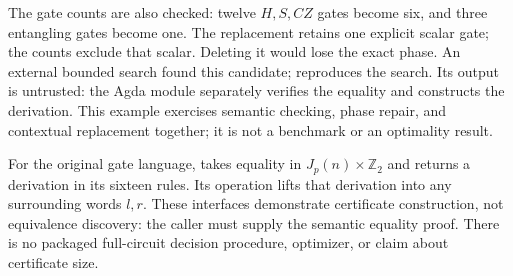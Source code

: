 The gate counts are also checked: twelve $H,S,CZ$ gates become six,
and three entangling gates become one. The replacement retains one
explicit scalar gate; the counts exclude that scalar. Deleting it
would lose the exact phase. An external bounded search found this
candidate;  reproduces the
search. Its output is untrusted: the Agda module separately verifies
the equality and constructs the derivation. This example exercises
semantic checking, phase repair, and contextual replacement together;
it is not a benchmark or an optimality result.

For the original gate language,  takes
equality in $J_p(n)\times\mathbb Z_2$ and returns a derivation in its
sixteen rules. Its  operation lifts that derivation into
any surrounding words $l,r$. These interfaces demonstrate certificate
construction, not equivalence discovery: the caller must supply the
semantic equality proof. There is no packaged full-circuit decision
procedure, optimizer, or claim about certificate size.

